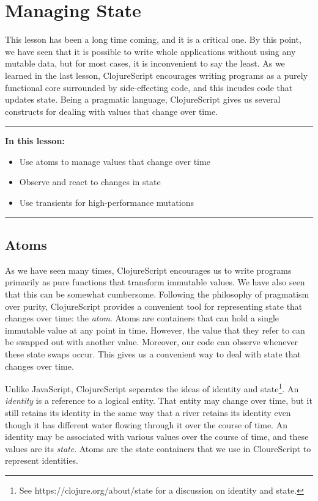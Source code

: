\documentclass[10pt,twoside,openright]{memoir}
\begin{document}
\chapter{Managing State}

This lesson has been a long time coming, and it is a critical one. By
this point, we have seen that it is possible to write whole applications
without using any mutable data, but for most cases, it is inconvenient
to say the least. As we learned in the last lesson, ClojureScript
encourages writing programs as a purely functional core surrounded by
side-effecting code, and this incudes code that updates state. Being a
pragmatic language, ClojureScript gives us several constructs for
dealing with values that change over time.

\begin{center}\rule{0.5\linewidth}{0.5pt}\end{center}

\textbf{In this lesson:}

\begin{itemize}
\tightlist
\item
  Use atoms to manage values that change over time
\item
  Observe and react to changes in state
\item
  Use transients for high-performance mutations
\end{itemize}

\begin{center}\rule{0.5\linewidth}{0.5pt}\end{center}


\section{Atoms}

As we have seen many times, ClojureScript encourages us to write
programs primarily as pure functions that transform immutable values. We
have also seen that this can be somewhat cumbersome. Following the
philosophy of pragmatism over purity, ClojureScript provides a
convenient tool for representing state that changes over time: the
\emph{atom}. Atoms are containers that can hold a single immutable value
at any point in time. However, the value that they refer to can be
swapped out with another value. Moreover, our code can observe whenever
these state swaps occur. This gives us a convenient way to deal with
state that changes over time.

Unlike JavaScript, ClojureScript separates the ideas of identity and
state\footnote{See https://clojure.org/about/state for a discussion on
  identity and state.}. An \emph{identity} is a reference to a logical
entity. That entity may change over time, but it still retains its
identity in the same way that a river retains its identity even though
it has different water flowing through it over the course of time. An
identity may be associated with various values over the course of time,
and these values are its \emph{state}. Atoms are the state containers
that we use in CloureScript to represent identities.
\end{document}
